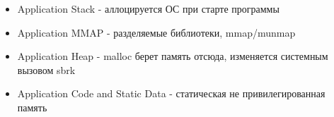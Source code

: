 \begin{frame}
\begin{columns}[T]
  \begin{column}{.6\textwidth}
    \begin{itemize}
      \item Application Stack - аллоцируется ОС при старте программы
      \item Application MMAP - разделяемые библиотеки, mmap/munmap
      \item Application Heap - malloc берет память отсюда, изменяется системным вызовом sbrk
      \item Application Code and Static Data - статическая не привилегированная память
    \end{itemize}
  \end{column}
\end{columns}

\end{frame}

